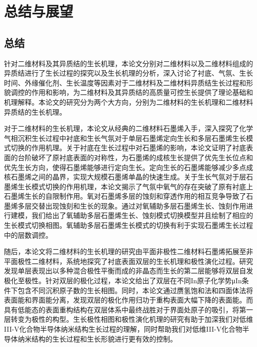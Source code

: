 
\chapter{总结与展望}
\section{总结}
针对二维材料及其异质结的生长机理，本论文分别对二维材料以及二维材料组成的异质结进行了生长过程的探究以及生长机理的分析，深入讨论了衬底、气氛、生长时间、外缘催化剂、生长温度等因素对于二维材料及二维材料异质结生长过程和形貌调控的作用和影响，为二维材料及其异质结的高质量可控生长提供了理论基础和机理解释。本论文的研究分为两个大方向，分别为二维材料的生长机理和二维材料异质结的生长机理。

对于二维材料的生长机理，本论文从经典的二维材料石墨烯入手，深入探究了化学气相沉积生长过程中衬底和生长气氛对于单层石墨烯定向生长和多层石墨烯生长模式切换的作用机理。关于衬底在生长过程中对石墨烯的影响，本论文证明了衬底表面的台阶破坏了原衬底表面的对称性，为石墨烯的成核生长提供了优先生长位点和优先生长方向，使得石墨烯能够进行定向生长。定向生长的石墨烯能够减少多点成核石墨烯之间的晶界，实现大规模石墨烯单晶的快速生成。关于生长气氛对于层石墨烯生长模式切换的作用机理，本论文揭示了气氛中氧气的存在突破了原有衬底上石墨烯生长的自限制作用。氧对石墨烯多层的蚀刻和穿透作用的相互竞争导致了石墨烯多层交替出现蚀刻和生长的现象。通过对氧辅助多层石墨烯生长、蚀刻作用进行建模，我们给出了氧辅助多层石墨烯生长、蚀刻模式切换模型并且绘制了相应的生长模式切换相图。氧辅助多层石墨烯生长模式的切换有利于实现石墨烯生长过程中的层数调控。

随后，本论文将二维材料的生长机理的研究由平面非极性二维材料石墨烯拓展至非平面极性二维材料，系统地探究了衬底表面双层的生长机理和极性演化过程。研究发现单层表现出以多种混合极性平衡而成的非晶态而生长的第二层能够将双层自发极化至极性。针对双层的极化过程，本论文给出了双层在不同In原子化学势μIn条件下包含不同沉积原子数的生长相图。同时，本论文通过赝氢饱和法和四面体法将表面能和界面能分离，发现双层的极化作用归功于重构表面大幅下降的表面能。而具有低能态的表面重构结构在双层体系中最终战胜对于界面处原子的吸引，将第一层转变为极性的构型。生长极性相图和极性演化机理的研究有助于加深我们对低维III-V化合物半导体纳米结构生长过程的理解，同时帮助我们对低维III-V化合物半导体纳米结构的生长过程和生长形貌进行更有效的控制。

